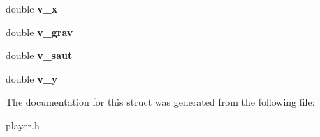 \begin{DoxyCompactItemize}
double {\bfseries v\+\_\+x}
\item 
\mbox{\label{structperso_a6443b326e16ceb20a9e17d063b3efe8c}} 
double {\bfseries v\+\_\+grav}
\item 
\mbox{\label{structperso_aa3391cfd7a6729e3e754b15f8446020f}} 
double {\bfseries v\+\_\+saut}
\item 
\mbox{\label{structperso_a298f6386e0533cf3c6d461b0af84fd24}} 
double {\bfseries v\+\_\+y}
\end{DoxyCompactItemize}


The documentation for this struct was generated from the following file\+:\begin{DoxyCompactItemize}
\item 
player.\+h\end{DoxyCompactItemize}
